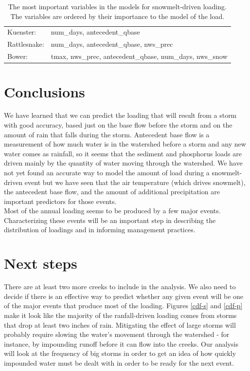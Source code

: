 \documentclass[10pt]{article}
\begin{document}
\begin{table}[h!]
\begin{center}
\begin{tabular}{ll}
        \hspace{5mm} Kuenster: & num\_days, antecedent\_qbase\\
        \hspace{5mm} Rattlesnake: & num\_days, antecedent\_qbase, nws\_prec\\
        \hspace{5mm} Bower: & tmax, nws\_prec, antecedent\_qbase, num\_days, nws\_snow\\
    \end{tabular}
    \caption{The most important variables in the models for snowmelt-driven loading. The variables are ordered by their importance to the model of the load. \label{snow_predictor_list}}
    \end{center}
\end{table}

\section{Conclusions}
We have learned that we can predict the loading that will result from a storm with good accuracy, based just on the base flow before the storm and on the amount of rain that falls during the storm. Antecedent base flow is a measurement of how much water is in the watershed before a storm and any new water comes as rainfall, so it seems that the sediment and phosphorus loads are driven mainly by the quantity of water moving through the watershed. We have not yet found an accurate way to model the amount of load during a snowmelt-driven event but we have seen that the air temperature (which drives snowmelt), the antecedent base flow, and the amount of additional precipitation are important predictors for those events.\\

Most of the annual loading seems to be produced by a few major events. Characterizing these events will be an important step in describing the distribution of loadings and in informing management practices.\\

\section{Next steps}
There are at least two more creeks to include in the analysis. We also need to decide if there is an effective way to predict whether any given event will be one of the major events that produce most of the loading. Figures \ref{cdf-s} and \ref{cdf-p} make it look like the majority of the ranfall-driven loading comes from storms that drop at least two inches of rain. Mitigating the effect of large storms will probably require slowing the water's movement through the watershed - for instance, by impounding runoff before it can flow into the creeks. Our analysis will look at the frequency of big storms in order to get an idea of how quickly impounded water must be dealt with in order to be ready for the next event.
\end{document}
